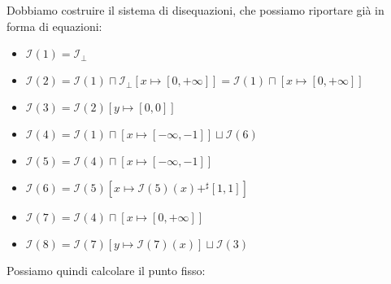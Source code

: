 Dobbiamo costruire il sistema di disequazioni, che possiamo
riportare già in forma di equazioni:
\begin{itemize}
    \item $\mathcal{I}(1) = \mathcal{I}_\bot$
    \item $\mathcal{I}(2) = \mathcal{I}(1) \sqcap \mathcal{I}_\bot [x \mapsto [0, +\infty]] =
    \mathcal{I}(1) \sqcap [x \mapsto [0, +\infty]]$
    \item $\mathcal{I}(3) = \mathcal{I}(2) [y \mapsto [0, 0]]$
    \item $\mathcal{I}(4) = \mathcal{I}(1) \sqcap [x \mapsto [-\infty, -1]] \sqcup 
    \mathcal{I}(6)$
    \item $\mathcal{I}(5) = \mathcal{I}(4) \sqcap [x \mapsto [-\infty, -1]]$
    \item $\mathcal{I}(6) = \mathcal{I}(5) [x \mapsto \mathcal{I}(5)(x) +^\sharp [1, 1]]$
    \item $\mathcal{I}(7) = \mathcal{I}(4) \sqcap [x \mapsto [0, +\infty]]$
    \item $\mathcal{I}(8) = \mathcal{I}(7) [y \mapsto \mathcal{I}(7)(x)]
    \sqcup \mathcal{I}(3)$
\end{itemize}
Possiamo quindi calcolare il punto fisso:
